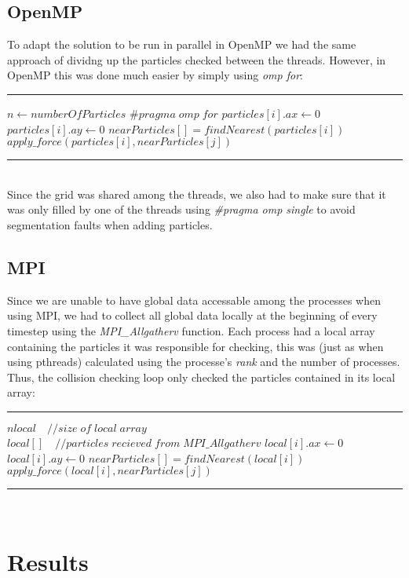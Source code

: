 \documentclass[11pt,a4paper]{article}
\begin{document}
\subsection{OpenMP}
To adapt the solution to be run in parallel in OpenMP we had the same approach of dividng up the particles checked between the threads. However, in OpenMP this was done much easier by simply using \emph{omp for}:
\\
\rule{125mm}{0.1pt}
\begin{algorithmic}
\STATE $n \gets numberOfParticles$
\STATE $\#pragma\;omp\;for$
	\STATE $particles[i].ax \gets 0$
	\STATE $particles[i].ay \gets 0$
	\STATE $nearParticles[] = findNearest(particles[i])$
			\STATE $apply\_force(particles[i],nearParticles[j])$
	\ENDFOR
\ENDFOR 
\end{algorithmic}
\rule{125mm}{0.1pt}
\vspace{10pt}
\\
Since the grid was shared among the threads, we also had to make sure that it was only filled by one of the threads using \emph{\#pragma omp single} to avoid segmentation faults when adding particles.
\subsection{MPI}
Since we are unable to have global data accessable among the processes when using MPI, we had to collect all global data locally at the beginning of every timestep using the \emph{MPI\_Allgatherv} function. Each process had a local array containing the particles it was responsible for checking, this was (just as when using pthreads) calculated using the processe's \emph{rank} and the number of processes. Thus, the collision checking loop only checked the particles contained in its local array:
\\
\rule{125mm}{0.1pt}
\begin{algorithmic}
\STATE $nlocal\quad //size\;of\;local\;array$
\STATE $local[]\quad //particles\;recieved\;from\;MPI\_Allgatherv$
	\STATE $local[i].ax \gets 0$
	\STATE $local[i].ay \gets 0$
	\STATE $nearParticles[] = findNearest(local[i])$
			\STATE $apply\_force(local[i],nearParticles[j])$
	\ENDFOR
\ENDFOR 
\end{algorithmic}
\rule{125mm}{0.1pt}
\vspace{10pt}
\\
\section{Results}
\end{document}
